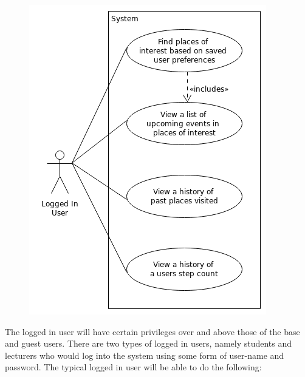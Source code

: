 \begin{figure} 
  \includegraphics[width=\textwidth]{diagrams/Specific_Requirements/Loggedin_User_Case_Diagram.png}
\end{figure}

The logged in user will have certain privileges over and above those of the base and guest users. There are two types of logged in users, namely students and lecturers who would log into the system using some form of user-name and password. The typical logged in user will be able to do the following:

